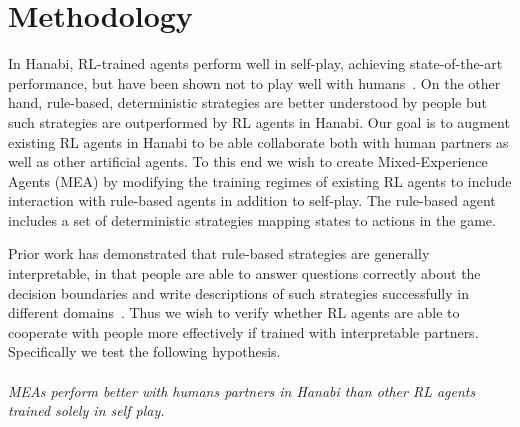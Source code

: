 \documentclass[letterpaper]{article} %
\begin{document}
\section{Methodology}


In Hanabi, RL-trained agents   perform well in self-play, achieving state-of-the-art performance, but have been shown not  to play well with humans~\cite{OP}.
 On the other hand, rule-based, deterministic strategies   are  better understood by  people  but such strategies are outperformed by RL agents in Hanabi. 
 Our goal is to augment existing RL agents in Hanabi to be able collaborate both with human partners as well as other artificial agents. 
To this end we wish to create Mixed-Experience Agents (MEA) by modifying the training regimes of existing RL agents to include interaction with  rule-based agents in addition to self-play. The rule-based agent   includes a set of    deterministic strategies  mapping states to actions in the game. %

 Prior work    has demonstrated that rule-based strategies are generally  interpretable, in that people are able to answer questions correctly about the decision boundaries  and write descriptions of such strategies successfully in different domains~\cite{lakkaraju2016interpretable}.  Thus we wish to verify whether RL agents are able to cooperate with people more effectively if trained with interpretable partners. Specifically we
 test the following hypothesis.
 \paragraph{}
 \emph{MEAs perform better with humans partners in Hanabi than  other RL agents trained  solely in self play. }
 \paragraph{}
\end{document}
